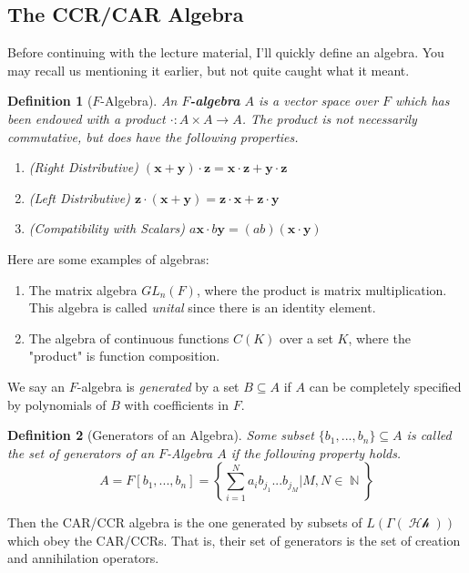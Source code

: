 \documentclass{article}
\DeclareMathOperator{\Hh}{\mathcal{Hh}}
\DeclareMathOperator{\NN}{\mathbb{N}}
\newcommand{\ve}[1]{\mathbf{#1}}
\newtheorem{defn}{Definition}
\begin{document}




\subsection{The CCR/CAR Algebra}
Before continuing with the lecture material, I'll quickly define an algebra. You may recall us mentioning it earlier, but not quite caught what it meant.
\begin{defn}[$F$-Algebra]
An \textbf{$F$-algebra} $A$ is a vector space over $F$ which has been endowed with a  product $\cdot : A\times A \to A$. The product is not necessarily commutative, but does have the following properties.
\begin{enumerate}
\item (Right Distributive) $(\ve{x}+\ve{y})\cdot \ve{z} = \ve{x}\cdot \ve{z} + \ve{y}\cdot \ve{z}$
\item (Left Distributive) $\ve{z}\cdot(\ve{x}+\ve{y}) = \ve{z}\cdot \ve{x} + \ve{z} \cdot \ve{y}$
\item (Compatibility with Scalars) $a\ve{x}\cdot b\ve{y} = (ab)(\ve{x}\cdot \ve{y})$
\end{enumerate}
\end{defn}

Here are some examples of algebras:
\begin{enumerate}
\item The matrix algebra $GL_n(F)$, where the product is matrix multiplication. This algebra is called \textit{unital} since there is an identity element.
\item The algebra of continuous functions $C(K)$ over a set $K$, where the "product" is function composition.
\end{enumerate}

We say an $F$-algebra is \textit{generated} by a set $B \subseteq A$ if $A$ can be completely specified by polynomials of $B$ with coefficients in $F$.

\begin{defn}[Generators of an Algebra] Some subset $\{b_1,...,b_n\}\subseteq A$ is called the set of generators of an $F$-Algebra $A$ if the following property holds.
\begin{equation}
A = F[b_1,...,b_n] = \left\{\sum_{i=1}^N a_i b_{j_1}...b_{j_M} | M, N \in \NN\right\}
\end{equation}
\end{defn}

Then the CAR/CCR algebra is the one generated by subsets of $L(\Gamma(\Hh))$ which obey the CAR/CCRs. That is, their set of generators is the set of creation and annihilation operators.
\end{document}
